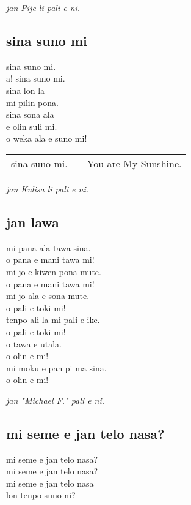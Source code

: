 \textit{jan Pije li pali e ni. \cite{www:Pije:01}}
%
\subsection{sina suno mi}

sina suno mi. \\
a! sina suno mi. \\
sina lon la \\
mi pilin pona. \\
sina sona ala \\
e olin suli mi. \\
o weka ala e suno mi! 

\begin{supertabular}{p{5,5cm}|ll}
sina suno mi. && You are My Sunshine. \\
\end{supertabular}

\textit{jan Kulisa li pali e ni. \cite{www:janKluisa:01}}
%
\subsection{jan lawa}

mi pana ala tawa sina. \\
o pana e mani tawa mi! \\
mi jo e kiwen pona mute. \\
o pana e mani tawa mi! \\
mi jo ala e sona mute. \\
o pali e toki mi!  \\
tenpo ali la mi pali e ike. \\
o pali e toki mi! \\
o tawa e utala. \\
o olin e mi! \\
mi moku e pan pi ma sina. \\
o olin e mi!

\textit{jan "Michael F." pali e ni. \cite{www:failbluedot:01}}


\subsection{mi seme e jan telo nasa?}

mi seme e jan telo nasa? \\
mi seme e jan telo nasa? \\
mi seme e jan telo nasa \\
lon tenpo suno ni?

